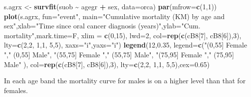 \documentclass[
]{book}
\newenvironment{Shaded}{\begin{snugshade}}{\end{snugshade}}
\newcommand{\AttributeTok}[1]{\textcolor[rgb]{0.13,0.29,0.53}{#1}}
\newcommand{\DecValTok}[1]{\textcolor[rgb]{0.00,0.00,0.81}{#1}}
\newcommand{\FloatTok}[1]{\textcolor[rgb]{0.00,0.00,0.81}{#1}}
\newcommand{\FunctionTok}[1]{\textcolor[rgb]{0.13,0.29,0.53}{\textbf{#1}}}
\newcommand{\NormalTok}[1]{#1}
\newcommand{\OtherTok}[1]{\textcolor[rgb]{0.56,0.35,0.01}{#1}}
\newcommand{\SpecialCharTok}[1]{\textcolor[rgb]{0.81,0.36,0.00}{\textbf{#1}}}
\newcommand{\StringTok}[1]{\textcolor[rgb]{0.31,0.60,0.02}{#1}}
\begin{document}
\begin{Shaded}
\begin{Highlighting}[]
\NormalTok{s.agrx }\OtherTok{\textless{}{-}} \FunctionTok{survfit}\NormalTok{(suob }\SpecialCharTok{\textasciitilde{}}\NormalTok{ agegr }\SpecialCharTok{+}\NormalTok{ sex, }\AttributeTok{data=}\NormalTok{orca)}
\FunctionTok{par}\NormalTok{(}\AttributeTok{mfrow=}\FunctionTok{c}\NormalTok{(}\DecValTok{1}\NormalTok{,}\DecValTok{1}\NormalTok{))}
\FunctionTok{plot}\NormalTok{(s.agrx, }\AttributeTok{fun=}\StringTok{"event"}\NormalTok{, }\AttributeTok{main=}\StringTok{"Cumulative mortality (KM) by age and sex"}\NormalTok{,}\AttributeTok{xlab=}\StringTok{"Time since oral cancer diagnosis (years)"}\NormalTok{,}\AttributeTok{ylab=}\StringTok{"Cum. mortality"}\NormalTok{,}\AttributeTok{mark.time=}\NormalTok{F, }\AttributeTok{xlim =} \FunctionTok{c}\NormalTok{(}\DecValTok{0}\NormalTok{,}\DecValTok{15}\NormalTok{), }\AttributeTok{lwd=}\DecValTok{2}\NormalTok{,}
             \AttributeTok{col=}\FunctionTok{rep}\NormalTok{(}\FunctionTok{c}\NormalTok{(cB8[}\DecValTok{7}\NormalTok{], cB8[}\DecValTok{6}\NormalTok{]),}\DecValTok{3}\NormalTok{), }\AttributeTok{lty=}\FunctionTok{c}\NormalTok{(}\DecValTok{2}\NormalTok{,}\DecValTok{2}\NormalTok{, }\DecValTok{1}\NormalTok{,}\DecValTok{1}\NormalTok{, }\DecValTok{5}\NormalTok{,}\DecValTok{5}\NormalTok{),}
     \AttributeTok{xaxs=}\StringTok{"i"}\NormalTok{,}\AttributeTok{yaxs=}\StringTok{"i"}\NormalTok{)}
\FunctionTok{legend}\NormalTok{(}\DecValTok{12}\NormalTok{,}\FloatTok{0.35}\NormalTok{, }\AttributeTok{legend=}\FunctionTok{c}\NormalTok{(}\StringTok{"(0,55] Female "}\NormalTok{,}\StringTok{" (0,55] Male"}\NormalTok{,}
                       \StringTok{"(55,75] Female "}\NormalTok{,}\StringTok{" (55,75] Male"}\NormalTok{,}
                       \StringTok{"(75,95] Female "}\NormalTok{,}\StringTok{" (75,95] Male"}\NormalTok{ ),}
       \AttributeTok{col=}\FunctionTok{rep}\NormalTok{(}\FunctionTok{c}\NormalTok{(cB8[}\DecValTok{7}\NormalTok{], cB8[}\DecValTok{6}\NormalTok{]),}\DecValTok{3}\NormalTok{), }\AttributeTok{lty=}\FunctionTok{c}\NormalTok{(}\DecValTok{2}\NormalTok{,}\DecValTok{2}\NormalTok{, }\DecValTok{1}\NormalTok{,}\DecValTok{1}\NormalTok{, }\DecValTok{5}\NormalTok{,}\DecValTok{5}\NormalTok{),}\AttributeTok{cex=}\FloatTok{0.65}\NormalTok{)}
\end{Highlighting}
\end{Shaded}

In each age band the mortality curve for males is on a higher level
than that for females.
\end{document}
